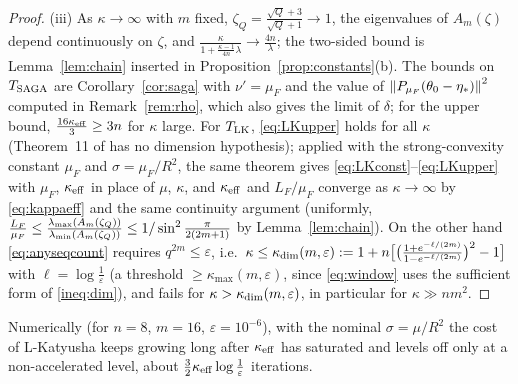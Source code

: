\begin{proof}
(iii) As $\kappa\to\infty$ with $m$ fixed, $\zeta_Q=\frac{\sqrt Q+3}{\sqrt Q+1}\to1$, the eigenvalues of $A_m(\zeta)$ depend continuously on $\zeta$, and $\frac{\kappa}{1+\frac{\kappa-1}{4n}\lambda}\to\frac{4n}\lambda$; the two-sided bound is Lemma~\ref{lem:chain} inserted in Proposition~\ref{prop:constants}(b). The bounds on $T_{\rm SAGA}$ are Corollary~\ref{cor:saga} with $\nu'=\mu_F$ and the value of $\left\|P_{\mu_F}(\theta_0-\eta_\ast)\right\|^2$ computed in Remark~\ref{rem:rho}, which also gives the limit of $\delta$; for the upper bound, $\frac{16\kappa_{\rm eff}}3\ge3n$ for $\kappa$ large. For $T_{\rm LK}$, \eqref{eq:LKupper} holds for all $\kappa$ (Theorem~11 of \cite{kovalev2020dont} has no dimension hypothesis); applied with the strong-convexity constant $\mu_F$ and $\sigma=\mu_F/R^2$, the same theorem gives \eqref{eq:LKconst}--\eqref{eq:LKupper} with $\mu_F$, $\kappa_{\rm eff}$ in place of $\mu$, $\kappa$, and $\kappa_{\rm eff}$ and $L_F/\mu_F$ converge as $\kappa\to\infty$ by \eqref{eq:kappaeff} and the same continuity argument (uniformly, $\frac{L_F}{\mu_F}\le\frac{\lambda_{\max}(A_m(\zeta_Q))}{\lambda_{\min}(A_m(\zeta_Q))}\le1/\sin^2\frac{\pi}{2(2m+1)}$ by Lemma~\ref{lem:chain}). On the other hand \eqref{eq:anyseqcount} requires $q^{2m}\le\varepsilon$, i.e.\ $\kappa\le\kappa_{\rm dim}(m,\varepsilon):=1+n\big[\big(\frac{1+e^{-\ell/(2m)}}{1-e^{-\ell/(2m)}}\big)^2-1\big]$ with $\ell=\log\frac1\varepsilon$ (a threshold $\ge\kappa_{\max}(m,\varepsilon)$, since \eqref{eq:window} uses the sufficient form of \eqref{ineq:dim}), and fails for $\kappa>\kappa_{\rm dim}(m,\varepsilon)$, in particular for $\kappa\gg nm^2$.
\end{proof}

Numerically (for $n=8$, $m=16$, $\varepsilon=10^{-6}$), with the nominal $\sigma=\mu/R^2$ the cost of L-Katyusha keeps growing long after $\kappa_{\rm eff}$ has saturated and levels off only at a non-accelerated level, about $\frac32\kappa_{\rm eff}\log\frac1\varepsilon$ iterations.

